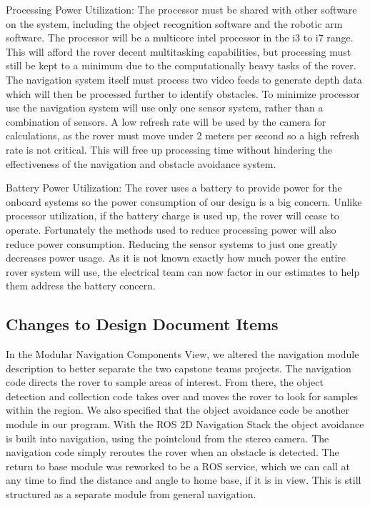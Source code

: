 \documentclass[10pt, oneside,onecolumn]{IEEEtran}
\begin{document}
\begin{titlepage}
\begin{itemize}
\subitem Processing Power Utilization: The processor must be shared with other software on the system, including the object recognition software and the robotic arm software. The processor will be a multicore intel processor in the i3 to i7 range. This will afford the rover decent multitasking capabilities, but processing must still be kept to a minimum due to the computationally heavy tasks of the rover. The navigation system itself must process two video feeds to generate depth data which will then be processed further to identify obstacles. To minimize processor use the navigation system will use only one sensor system, rather than a combination of sensors. A low refresh rate will be used by the camera for calculations, as the rover must move under 2 meters per second so a high refresh rate is not critical. This will free up processing time without hindering the effectiveness of the navigation and obstacle avoidance system.

\subitem Battery Power Utilization: The rover uses a battery to provide power for the onboard systems so the power consumption of our design is a big concern. Unlike processor utilization, if the battery charge is used up, the rover will cease to operate. Fortunately the methods used to reduce processing power will also reduce power consumption. Reducing the sensor systems to just one greatly decreases power usage. As it is not known exactly how much power the entire rover system will use, the electrical team can now factor in our estimates to help them address the battery concern. 

\end{itemize}

\subsection{Changes to Design Document Items}
In the Modular Navigation Components View, we altered the navigation module description to better separate the two capstone teams projects. The navigation code directs the rover to sample areas of interest. From there, the object detection and collection code takes over and moves the rover to look for samples within the region. We also specified that the object avoidance code be another module in our program. With the ROS 2D Navigation Stack the object avoidance is built into navigation, using the pointcloud from the stereo camera. The navigation code simply reroutes the rover when an obstacle is detected. The return to base module was reworked to be a ROS service, which we can call at any time to find the distance and angle to home base, if it is in view. This is still structured as a separate module from general navigation.


\end{titlepage}
\end{document}

